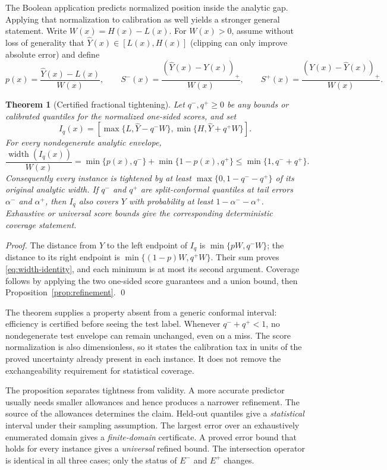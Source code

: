 \documentclass[10pt]{article}
\newtheorem{theorem}{Theorem}
\begin{document}
The Boolean application predicts normalized position inside the analytic
gap.  Applying that normalization to calibration as well yields a stronger
general statement.  Write $W(x)=H(x)-L(x)$.  For $W(x)>0$, assume without loss
of generality that $\widehat Y(x)\in[L(x),H(x)]$ (clipping can only improve
absolute error) and define
\[
 p(x)=\frac{\widehat Y(x)-L(x)}{W(x)},\qquad
 S^-(x)=\frac{(\widehat Y(x)-Y(x))_+}{W(x)},\qquad
 S^+(x)=\frac{(Y(x)-\widehat Y(x))_+}{W(x)}.
\]

\begin{theorem}[Certified fractional tightening]
\label{thm:fractional}
Let $q^-,q^+\ge0$ be any bounds or calibrated quantiles for the normalized
one-sided scores, and set
\begin{equation}
 I_q(x)=\left[\max\{L,\widehat Y-q^-W\},
                   \min\{H,\widehat Y+q^+W\}\right].
 \label{eq:gap-normalized}
\end{equation}
For every nondegenerate analytic envelope,
\begin{equation}
 \frac{\operatorname{width}(I_q(x))}{W(x)}
 =\min\{p(x),q^-\}+\min\{1-p(x),q^+\}
 \le \min\{1,q^-+q^+\}.
 \label{eq:width-identity}
\end{equation}
Consequently every instance is tightened by at least
$\max\{0,1-q^--q^+\}$ of its original analytic width.  If $q^-$ and $q^+$
are split-conformal quantiles at tail errors $\alpha^-$ and $\alpha^+$, then
$I_q$ also covers $Y$ with probability at least
$1-\alpha^--\alpha^+$.  Exhaustive or universal score bounds give the
corresponding deterministic coverage statement.
\end{theorem}
\emph{Proof.}  The distance from $\widehat Y$ to the left endpoint of $I_q$
is $\min\{pW,q^-W\}$; the distance to its right endpoint is
$\min\{(1-p)W,q^+W\}$.  Their sum proves \eqref{eq:width-identity}, and each
minimum is at most its second argument.  Coverage follows by applying the two
one-sided score guarantees and a union bound, then Proposition~\ref{prop:refinement}.
\qed

The theorem supplies a property absent from a generic conformal interval:
efficiency is certified before seeing the test label.  Whenever
$q^-+q^+<1$, no nondegenerate test envelope can remain unchanged, even on a
miss.  The score normalization is also dimensionless, so it states the
calibration tax in units of the proved uncertainty already present in each
instance.  It does not remove the exchangeability requirement for statistical
coverage.

The proposition separates tightness from validity.  A more accurate predictor
usually needs smaller allowances and hence produces a narrower refinement.
The source of the allowances determines the claim.  Held-out quantiles give a
\emph{statistical} interval under their sampling assumption.  The largest
error over an exhaustively enumerated domain gives a \emph{finite-domain}
certificate.  A proved error bound that holds for every instance gives a
\emph{universal} refined bound.  The intersection operator is identical in
all three cases; only the status of $E^-$ and $E^+$ changes.
\end{document}
